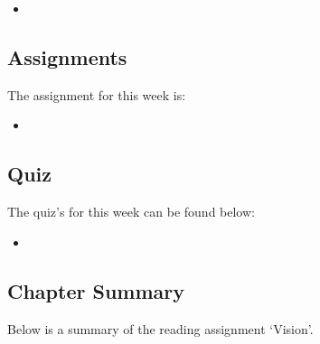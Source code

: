 \begin{itemize}
    \item {}
\end{itemize}

\subsection{Assignments}

The assignment for this week is:

\begin{itemize}
    \item {}
\end{itemize}

\subsection{Quiz}

The quiz's for this week can be found below:

\begin{itemize}
    \item {}
\end{itemize}

\newpage

\subsection{Chapter Summary}

Below is a summary of the reading assignment `Vision'.

